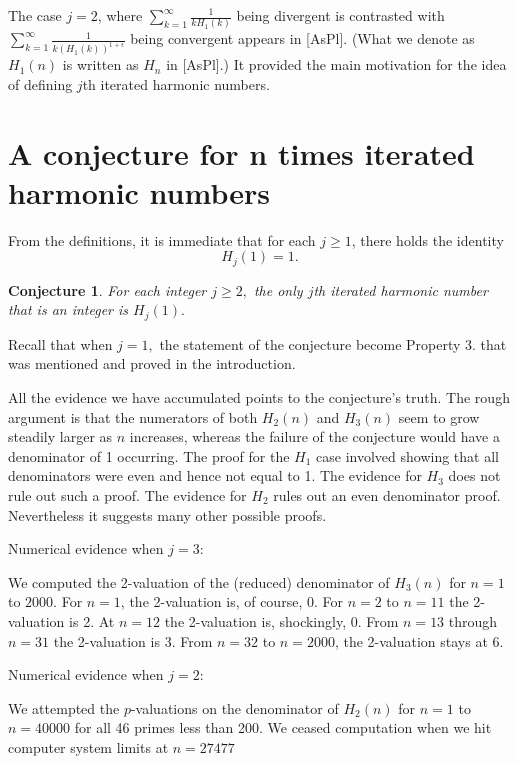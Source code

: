 \documentclass{article}
\newtheorem{conjecture}[theorem]{Conjecture}
\begin{document}
The case $j=2$, where $\sum_{k=1}^{\infty }\frac{1}{kH_{1}\left( k\right) }$
being divergent is contrasted with  $\sum_{k=1}^{\infty }\frac{1}{k\left(
H_{1}\left( k\right) \right) ^{1+\epsilon }}$ being convergent appears in
[AsPl]. (What we denote as $H_{1}\left( n\right) $ is written as $H_{n}$ in
[AsPl].)  It provided the main motivation for the idea of defining $j$th
iterated harmonic numbers.

\section{A conjecture for n times iterated harmonic numbers}

From the definitions, it is immediate that for each $j\geq 1$, there holds
the identity 
\[
H_{j}\left( 1\right) =1.
\]

\begin{conjecture}
For each integer $j\geq 2,$ the only $j$th iterated harmonic number that is
an integer is $H_{j}\left( 1\right) .$
\end{conjecture}

Recall that when $j=1,$ the statement of the conjecture become Property 3.
that was mentioned and proved in the introduction.

All the evidence we have accumulated points to the conjecture's truth. The
rough argument is that the numerators of both $H_{2}\left( n\right) $ and $%
H_{3}\left( n\right) $ seem to grow steadily larger as $n$ increases,
whereas the failure of the conjecture would have a denominator of 1
occurring. The proof for the $H_{1}$ case involved showing that all
denominators were even and hence not equal to 1. The evidence for $H_{3}$
does not rule out such a proof. The evidence for $H_{2}$ rules out an even
denominator proof. Nevertheless it suggests many other possible proofs.

Numerical evidence when $j=3:$

We computed the 2-valuation of the (reduced) denominator of
$ H_{3}\left( n\right) $ for $n=1$ to $2000$. For $n=1$, the
2-valuation is, of course, 0. For $n=2$ to $n=11$ the 2-valuation is
2. At $n=12$ the 2-valuation is, shockingly, 0. From $n=13$ through
$n=31$ the 2-valuation is 3. From $n=32$ to $n=2000$, the 2-valuation
stays at 6.

Numerical evidence when $j=2:$

We attempted the $p$-valuations on the denominator of
$H_{2}\left( n\right) $ for $n=1$ to $n=40000$ for all 46 primes less
than 200. We ceased computation when we hit computer system limits at
$n=27477$
\end{document}
